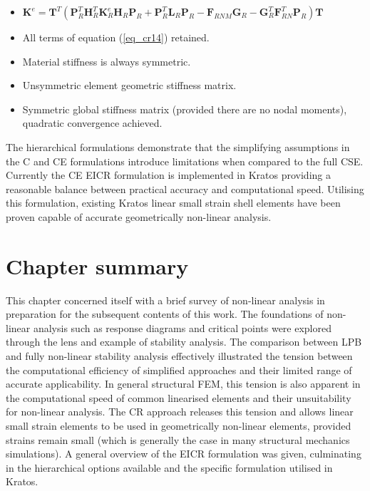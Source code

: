 \begin{itemize}
 		\begin{itemize}
 		\item $\mathbf{K}^e 
 		=
 		\mathbf{T}^T
 		(
 		\mathbf{P}_R^T
 		\mathbf{H}_R^T
 		\mathbf{K}_R^e
 		\mathbf{H}_R
 		\mathbf{P}_R
 		+
 		\mathbf{P}_R^T
 		\mathbf{L}_R
 		\mathbf{P}_R
 		-
 		\mathbf{F}_{RNM}
 		\mathbf{G}_R
 		-
 		\mathbf{G}_R^T
 		\mathbf{F}_{RN}^T
 		\mathbf{P}_R
 		)
 		\mathbf{T}$
 		\item All terms of equation (\ref{eq_cr14}) retained. 
 		\item Material stiffness is always symmetric.
 		\item Unsymmetric element geometric stiffness matrix.
 		\item Symmetric global stiffness matrix (provided there are no nodal moments), quadratic convergence achieved.
 	\end{itemize}
 \end{itemize}

The hierarchical formulations demonstrate that the simplifying assumptions in the C and CE formulations introduce limitations when compared to the full CSE. Currently the CE EICR formulation is implemented in Kratos providing a reasonable balance between practical accuracy and computational speed. Utilising this formulation, existing Kratos linear small strain shell elements have been proven capable of accurate geometrically non-linear analysis.

\section{Chapter summary}
This chapter concerned itself with a brief survey of non-linear analysis in preparation for the subsequent contents of this work. The foundations of non-linear analysis such as response diagrams and critical points were explored through the lens and example of stability analysis. The comparison between LPB and fully non-linear stability analysis effectively illustrated the tension between the computational efficiency of simplified approaches and their limited range of accurate applicability. In general structural FEM, this tension is also apparent in the computational speed of common linearised elements and their unsuitability for non-linear analysis. The CR approach releases this tension and allows linear small strain elements to be used in geometrically non-linear elements, provided strains remain small (which is generally the case in many structural mechanics simulations). A general overview of the EICR formulation was given, culminating in the hierarchical options available and the specific formulation utilised in Kratos.